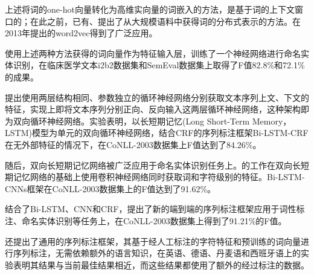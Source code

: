 上述将词的one-hot向量转化为高维实向量的词嵌入的方法，是基于词的上下文窗口的；在此之前，已有\citet{bengio2003neural}、\citet{mikolov2010recurrent}提出了从大规模语料中获得词的分布式表示的方法。\citet{mikolov2013distributed, mikolov2013efficient}在2013年提出的word2vec得到了广泛应用。

\citet{wu2015study}使用上述两种方法获得的词向量作为特征输入层，训练了一个神经网络进行命名实体识别，在临床医学文本i2b2数据集和SemEval数据集上取得了F值82.8\%和72.1\%的成果。

\citet{huang2015bidirectional}提出使用两层结构相同、参数独立的循环神经网络分别获取文本序列上文、下文的特征，实现上即将文本序列分别正向、反向输入这两层循环神经网络，这种架构即为双向循环神经网络。实验表明，以长短期记忆(Long Short-Term Memory， LSTM)模型为单元的双向循环神经网络，结合CRF的序列标注框架Bi-LSTM-CRF在无外部特征的情况下，在CoNLL-2003数据集上F值达到了84.26\%。

随后，双向长短期记忆网络被广泛应用于命名实体识别任务上。\citet{chiu2015named}的工作在双向长短期记忆网络的基础上使用卷积神经网络同时获取词和字符级别的特征。Bi-LSTM-CNNs框架在CoNLL-2003数据集上的F值达到了91.62\%。

\citet{ma2016end}结合了Bi-LSTM、CNN和CRF，提出了新的端到端的序列标注框架应用于词性标注、命名实体识别等任务上，在CoNLL-2003数据集上得到了91.21\%的F值。

\citet{lample2016neural}还提出了通用的序列标注框架，其基于经人工标注的字符特征和预训练的词向量进行序列标注，无需依赖额外的语言知识，在英语、德语、丹麦语和西班牙语上的实验表明其结果与当前最佳结果相近，而这些结果都使用了额外的经过标注的数据。

